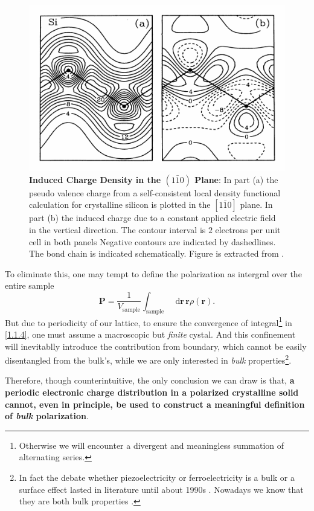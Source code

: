 \documentclass[10pt,nofootinbib]{revtex4}
\newcommand*\dd{\mathop{}\!\mathrm{d}}
\begin{document}
		\begin{figure}[!htp]
			\centering
			\includegraphics[scale=1]{silicon.pdf}
			\caption{{\bf Induced Charge Density in the $(1\bar{1}0)$ Plane}: In part (a) the pseudo valence charge from a self-consistent local density functional calculation for crystalline silicon is plotted in the $[1\bar{1}0]$ plane. In part (b) the induced charge due to a constant applied electric field in the vertical direction. The contour interval is $2$ electrons per unit cell in both panels Negative contours are indicated by dashedlines. The bond chain is indicated schematically. Figure is extracted from \cite{resta2007theory,hybertsen1987ab2}.}
			\label{fig:silicon}
		\end{figure}
		To eliminate this, one may tempt to define the polarization as intergral over the entire sample
		\begin{equation}\label{1.1.4}
			\bm{P}=\dfrac{1}{V_\text{sample}}\int_{\text{sample}}\dd\bm{r}\,\bm{r}\rho(\bm{r}).
		\end{equation}
		But due to periodicity of our lattice, to ensure the convergence of integral\footnote{Otherwise we will encounter a divergent and meaningless summation of alternating series.} in \eqref{1.1.4}, one must assume a macroscopic but \emph{finite} cystal. And this confinement will inevitablly introduce the contribution from boundary, which cannot be easily disentangled from the bulk's, while we are only interested in \emph{bulk} properties\footnote{In fact the debate whether piezoelectricity or ferroelectricity is a bulk or a surface effect lasted in literature until about 1990s \cite{resta2007theory,tagantsev1991electric}. Nowadays we know that they are both bulk properties \cite{kallin1984surface}.}.\par %
		Therefore, though counterintuitive, the only conclusion we can draw is that, \textbf{\color{red}a periodic electronic charge distribution in a polarized crystalline solid cannot, even in principle, be used to construct a meaningful definition of \emph{bulk} polarization}.
	
\end{document}
